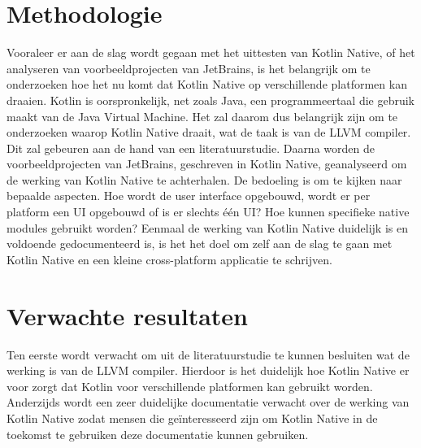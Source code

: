 	\section{Methodologie}
	\label{sec:methodologie}
	Vooraleer er aan de slag wordt gegaan met het uittesten van Kotlin Native, of het analyseren van voorbeeldprojecten van JetBrains, is het belangrijk om te onderzoeken hoe het nu komt dat Kotlin Native op verschillende platformen kan draaien. Kotlin is oorspronkelijk, net zoals Java, een programmeertaal die gebruik maakt van de Java Virtual Machine. Het zal daarom dus belangrijk zijn om te onderzoeken waarop Kotlin Native draait, wat de taak is van de LLVM compiler. Dit zal gebeuren aan de hand van een literatuurstudie.
	\newline
	\newline
	Daarna worden de voorbeeldprojecten van JetBrains, geschreven in Kotlin Native, geanalyseerd om de werking van Kotlin Native te achterhalen. De bedoeling is om te kijken naar bepaalde aspecten. Hoe wordt de user interface opgebouwd, wordt er per platform een UI opgebouwd of is er slechts één UI? Hoe kunnen specifieke native modules gebruikt worden? 
	\newline
	\newline
	Eenmaal de werking van Kotlin Native duidelijk is en voldoende gedocumenteerd is, is het het doel om zelf aan de slag te gaan met Kotlin Native en een kleine cross-platform applicatie te schrijven.
	
	\section{Verwachte resultaten}
	\label{sec:verwachte_resultaten}
	Ten eerste wordt verwacht om uit de literatuurstudie te kunnen besluiten wat de werking is van de LLVM compiler. Hierdoor is het duidelijk hoe Kotlin Native er voor zorgt dat Kotlin voor verschillende platformen kan gebruikt worden.
	\newline
	\newline
	Anderzijds wordt een zeer duidelijke documentatie verwacht over de werking van Kotlin Native zodat mensen die geïnteresseerd zijn om Kotlin Native in de toekomst te gebruiken deze documentatie kunnen gebruiken. 
	
